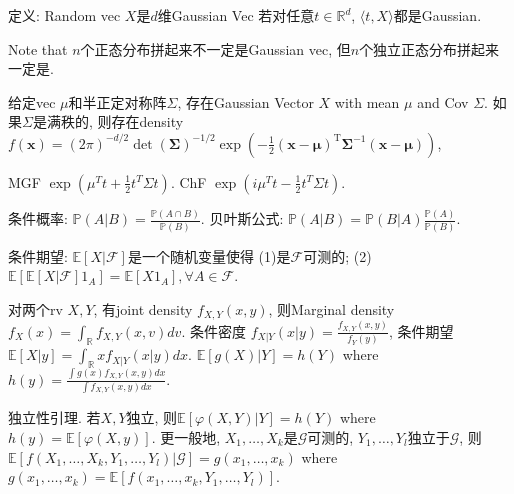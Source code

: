 \documentclass[UTF8]{ctexart}
\begin{document}
定义: Random vec $X$是$d$维Gaussian Vec 若对任意$t\in\mathbb{R}^d$, $\langle t,X \rangle $都是Gaussian.

Note that $n$个正态分布拼起来不一定是Gaussian vec, 但$n$个独立正态分布拼起来一定是.

给定vec $\mu$和半正定对称阵$\Sigma$, 存在Gaussian Vector $X$ with mean $\mu$ and Cov $\Sigma$.
如果$\Sigma$是满秩的, 则存在density
$f(\mathbf{x}) = (2 \pi)^{-d / 2} \operatorname{det}(\boldsymbol{\Sigma})^{-1 / 2} \exp \left(-\frac{1}{2}(\mathbf{x}-\boldsymbol{\mu})^{\mathrm{T}} \boldsymbol{\Sigma}^{-1}(\mathbf{x}-\boldsymbol{\mu})\right)$,

MGF  $\exp \left( \mu^T t + \frac{1}{2} t^T \Sigma t \right)$.
ChF $\exp \left( i \mu^T t - \frac{1}{2} t^T \Sigma t \right)$.

条件概率: $\mathbb{P}(A|B)=\frac{\mathbb{P}(A\cap B)}{\mathbb{P}(B)}$.
贝叶斯公式: $\mathbb{P}(A|B) = \mathbb{P}(B|A) \frac{\mathbb{P}(A)}{\mathbb{P}(B)}$.

条件期望: 
$\mathbb{E}[X|\mathcal{F}]$是一个随机变量使得
(1)是$\mathcal{F}$可测的; 
(2)$\mathbb{E}[\mathbb{E}[X|\mathcal{F}]1_A]=\mathbb{E}[X 1_A], \forall A \in\mathcal{F}$.

对两个rv $X,Y$, 有joint density $f_{X,Y}(x,y)$, 则Marginal density $f_X(x)=\int_{\mathbb{R}} f_{X,Y}(x,v)dv$.
条件密度 $f_{X|Y}(x|y) = \frac{f_{X,Y}(x,y)}{f_Y(y)}$,
条件期望 $\mathbb{E}[X|y]=\int_{\mathbb{R}}xf_{X|Y}(x|y)dx$.
$\mathbb{E}[g(X)|Y]=h(Y)$ where 
$h(y) = \frac{\int g(x)f_{X,Y}(x,y)dx}{\int f_{X,Y}(x,y)dx}$.

独立性引理. 若$X, Y$独立, 则$\mathbb{E}[\varphi(X,Y)|Y]=h(Y)$ where
$h(y)=\mathbb{E}[\varphi(X,y)]$.
更一般地, $X_1,\dots,X_k$是$\mathcal{G}$可测的, $Y_1,\dots,Y_l$独立于$\mathcal{G}$,
则$\mathbb{E}[f(X_1,\dots,X_k,Y_1,\dots,Y_l)|\mathcal{G}]=g(x_1,\dots,x_k)$
where $g(x_1,\dots,x_k)=\mathbb{E}[f(x_1,\dots,x_k,Y_1,\dots,Y_l)]$.
\end{document}
